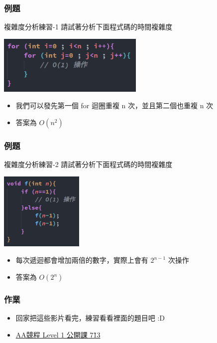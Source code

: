 \documentclass{beamer}
\begin{document}
\begin{frame}
    \frametitle{例題}
    \begin{block}{複雜度分析練習-1}
        請試著分析下面程式碼的時間複雜度

        \vspace{0.5cm}
        \includegraphics[width=7.0cm]{img/code_1.png}
    \end{block}
    \begin{itemize}
        \item<2-> 我們可以發先第一個 for 迴圈重複 n 次，並且第二個也重複 n 次
        \item<2-> 答案為 $O(n^2)$
    \end{itemize}
\end{frame}

\begin{frame}
    \frametitle{例題}
    \begin{block}{複雜度分析練習-2}
        請試著分析下面程式碼的時間複雜度

        \vspace{0.5cm}
        \includegraphics[width=4.0cm]{img/code_2.png}
    
        \begin{itemize}
            \item<2-> 每次遞迴都會增加兩倍的數字，實際上會有 $2^{n-1}$ 次操作
            \item<2-> 答案為 $O(2^n)$
        \end{itemize}
    \end{block}
\end{frame}

\begin{frame}
    \frametitle{作業}
    \begin{itemize}
        \item 回家把這些影片看完，練習看看裡面的題目吧 :D
        \item \href{https://youtube.com/playlist?list=PLuV4P3EY8fXl-2qmLTZVWS3deHyxxWLUI}{AA競程 Level 1 公開課 7\~13}
    \end{itemize}
\end{frame}
\end{document}
